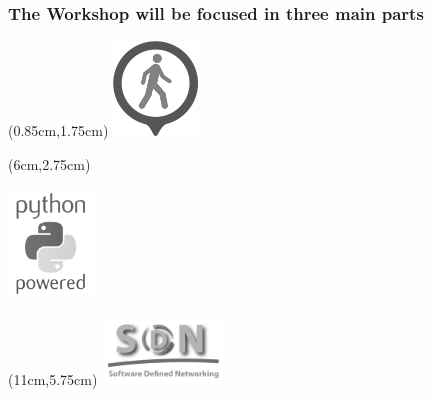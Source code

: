 \documentclass{beamer}
\begin{document}
\begin{frame}
  \frametitle{The Workshop will be focused in three main parts}

  \begin{textblock*}{2.5cm} (0.85cm,1.75cm) %
    \captionsetup{justification=centering}
    \includegraphics[width=2.25cm]{./images/walkthrough-gray.png} %
  \end{textblock*}

  \begin{textblock*}{3cm} (6cm,2.75cm) %
    \begin{center}
    \includegraphics[width=2.25cm]{images/python-gray.png}
    \end{center}
  \end{textblock*}

  \begin{textblock*}{3.2cm} (11cm,5.75cm) %
    \includegraphics[width=3.2cm]{images/sdn-gray.png}
  \end{textblock*}

\end{frame}
\end{document}
